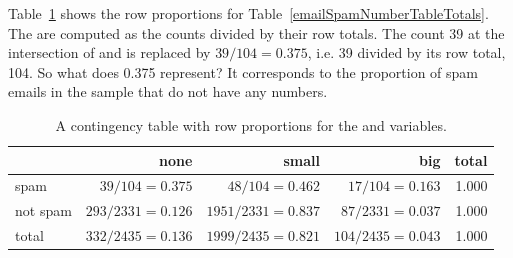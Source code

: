 

Table~\ref{rowPropSpamNumber} shows the row proportions for Table~\ref{emailSpamNumberTableTotals}. The  are computed as the counts divided by their row totals. The count 39 at the intersection of  and  is replaced by $39/104=0.375$, i.e. 39 divided by its row total, 104. So what does 0.375 represent? It corresponds to the proportion of spam emails in the sample that do not have any numbers.
\begin{table}[ht]
\centering
\begin{tabular}{l rrr r}
  \hline
 & none & small & big & total \\ 
  \hline
spam &  $39/104 = 0.375$ & $48/104 = 0.462$ & $17/104 = 0.163$ & 1.000 \\ 
not spam &  $293/2331 = 0.126$ & $1951/2331 = 0.837$ & $87/2331 = 0.037$ & 1.000 \\ 
   \hline
total & $332/2435 = 0.136$ & $1999/2435 = 0.821$ & $104/2435 = 0.043$ & 1.000 \\
  \hline
\end{tabular}
\caption{A contingency table with row proportions for the  and  variables.}
\label{rowPropSpamNumber}
\end{table}


